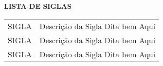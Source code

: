 \begin{center}
  \normalsize{\textbf{LISTA DE SIGLAS}}
\end{center}

\vspace{1mm}

\begin{center}
  \begin{tabular}{ m{3cm} m{10cm} } 

    SIGLA & Descrição da Sigla Dita bem Aqui  \\ 

    SIGLA & Descrição da Sigla Dita bem Aqui  \\ 
    
    SIGLA & Descrição da Sigla Dita bem Aqui  \\ 

  \end{tabular}
\end{center}
